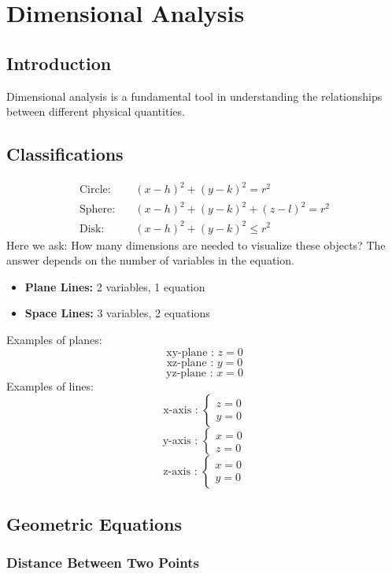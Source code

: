 \chapter{Dimensional Analysis}

\section{Introduction}
Dimensional analysis is a fundamental tool in understanding the relationships between different physical quantities.

\section{Classifications}

\begin{align*}
    \text{Circle:} \quad & (x-h)^2 + (y-k)^2 = r^2 \\
    \text{Sphere:} \quad & (x-h)^2 + (y-k)^2 + (z-l)^2 = r^2 \\
    \text{Disk:} \quad & (x-h)^2 + (y-k)^2 \leq r^2
\end{align*}
Here we ask: How many dimensions are needed to visualize these objects? The answer depends on the number of variables in the equation.

\begin{itemize}
    \item{\textbf{Plane Lines:} 2 variables, 1 equation}
    \item{\textbf{Space Lines:} 3 variables, 2 equations}
\end{itemize}
Examples of planes:
\[
\text{xy-plane : } z = 0
\]
\[
\text{xz-plane : } y = 0
\]
\[
\text{yz-plane : } x = 0
\]
Examples of lines:
\[
\text{x-axis : }
\begin{cases}
    z = 0\\
    y = 0
\end{cases}
\]
\[
\text{y-axis : }
\begin{cases}
    x = 0\\
    z = 0
\end{cases}
\]
\[
\text{z-axis : }
\begin{cases}
    x = 0\\
    y = 0
\end{cases}
\]
\pagebreak
\section{Geometric Equations}

\subsection{Distance Between Two Points}

